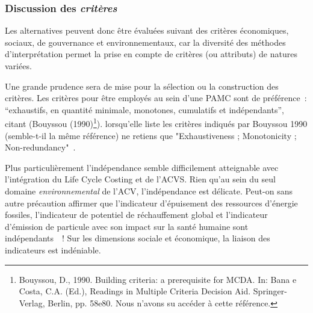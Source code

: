 
\subsubsection{Discussion des \textit{critères}}
Les alternatives peuvent donc être évaluées suivant des critères économiques, sociaux, de gouvernance et environnementaux, car la diversité des méthodes d'interprétation permet la prise en compte de critères (ou attributs) de natures variées.

Une grande prudence sera de mise pour la sélection ou la construction des critères.
Les critères pour être employés au sein d'une \gls{PAMC} sont de préférence~: %
``exhaustifs, en quantité minimale, monotones, cumulatifs et indépendants'', \citeauthor{rowley_aggregating_2012} citant (Bouyssou (1990)\footnote{Bouyssou, D., 1990. Building criteria: a prerequisite for MCDA. In: Bana e Costa, C.A. (Ed.), Readings in Multiple Criteria Decision Aid. Springer-Verlag, Berlin, pp. 58e80. Nous n'avons su accéder à cette référence.})\cite[p.27 (p.4 de l'article)]{rowley_aggregating_2012}.
\citeauthor{moullec_towards_2014} lorsqu'elle liste les critères indiqués par Bouyssou 1990 (semble-t-il la même référence) ne retiens que "Exhaustiveness ; Monotonicity ; Non-redundancy"~\cite{moullec_towards_2014}.

%
%
\label{sec:indépendance des indicateurs}
Plus particulièrement l'indépendance semble difficilement atteignable avec l'intégration du Life Cycle Costing et de l'\gls{ACVS}.
Rien qu'au sein du seul domaine \emph{environnemental} de l'\gls{ACV}, l'indépendance est délicate.
Peut-on sans autre précaution affirmer que l'indicateur d'épuisement des ressources d'énergie fossiles, l'indicateur de potentiel de réchauffement global et l'indicateur d'émission de particule avec son impact sur la santé humaine sont indépendants~~!
Sur les dimensions sociale et économique, la liaison des indicateurs est indéniable.


